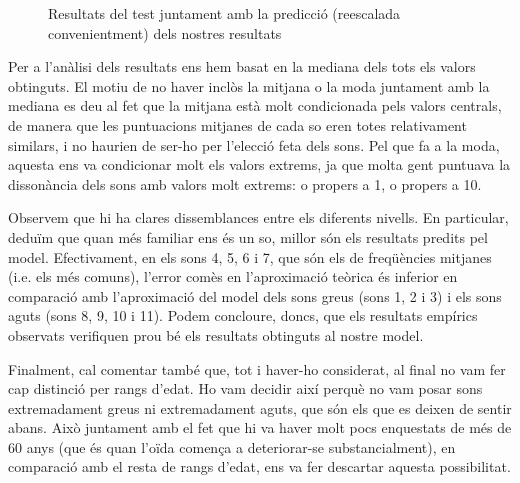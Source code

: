 \documentclass{article}
\theoremstyle{math}
\theoremstyle{TheoremNum}
\newcommand{\0}{\ensuremath{\vb{0}}}
\begin{document}
\begin{figure}[ht]
    \centering
    
    \caption{Resultats del test juntament amb la predicció (reescalada convenientment) dels nostres resultats}
\end{figure}
Per a l'anàlisi dels resultats ens hem basat en la mediana dels tots els valors obtinguts. El motiu de no haver inclòs la mitjana o la moda juntament amb la mediana es deu al fet que la mitjana està molt condicionada pels valors centrals, de manera que les puntuacions mitjanes de cada so eren totes relativament similars, i no haurien de ser-ho per l'elecció feta dels sons. Pel que fa a la moda, aquesta ens va condicionar molt els valors extrems, ja que molta gent puntuava la dissonància dels sons amb valors molt extrems: o propers a 1, o propers a 10.\par
Observem que hi ha clares dissemblances entre els diferents nivells. En particular, deduïm que quan més familiar ens és un so, millor són els resultats predits pel model. Efectivament, en els sons 4, 5, 6 i 7, que són els de freqüències mitjanes (i.e. els més comuns), l'error comès en l'aproximació teòrica és inferior en comparació amb l'aproximació del model dels sons greus (sons 1, 2 i 3) i els sons aguts (sons 8, 9, 10 i 11). Podem concloure, doncs, que els resultats empírics observats verifiquen prou bé els resultats obtinguts al nostre model.\par Finalment, cal comentar també que, tot i haver-ho considerat, al final no vam fer cap distinció per rangs d'edat. Ho vam decidir així perquè no vam posar sons extremadament greus ni extremadament aguts, que són els que es deixen de sentir abans. Això juntament amb el fet que hi va haver molt pocs enquestats de més de 60 anys (que és quan l'oïda comença a deteriorar-se substancialment), en comparació amb el resta de rangs d'edat, ens va fer descartar aquesta possibilitat.
\end{document}

